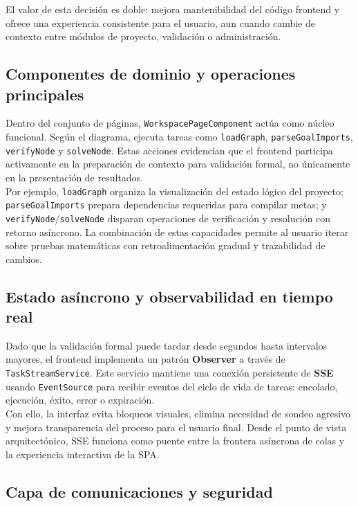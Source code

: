 \documentclass[12pt, letterpaper]{article}
\begin{document}
El valor de esta decisión es doble: mejora mantenibilidad del código frontend y ofrece una experiencia consistente para el usuario, aun cuando cambie de contexto entre módulos de proyecto, validación o administración.

\subsection{Componentes de dominio y operaciones principales}

Dentro del conjunto de páginas, \texttt{WorkspacePageComponent} actúa como núcleo funcional. Según el diagrama, ejecuta tareas como \texttt{loadGraph}, \texttt{parseGoalImports}, \texttt{verifyNode} y \texttt{solveNode}. Estas acciones evidencian que el frontend participa activamente en la preparación de contexto para validación formal, no únicamente en la presentación de resultados.\\

Por ejemplo, \texttt{loadGraph} organiza la visualización del estado lógico del proyecto; \texttt{parseGoalImports} prepara dependencias requeridas para compilar metas; y \texttt{verifyNode}/\texttt{solveNode} disparan operaciones de verificación y resolución con retorno asíncrono. La combinación de estas capacidades permite al usuario iterar sobre pruebas matemáticas con retroalimentación gradual y trazabilidad de cambios.

\subsection{Estado asíncrono y observabilidad en tiempo real}

Dado que la validación formal puede tardar desde segundos hasta intervalos mayores, el frontend implementa un patrón \textbf{Observer} a través de \texttt{TaskStreamService}. Este servicio mantiene una conexión persistente de \textbf{SSE} usando \texttt{EventSource} para recibir eventos del ciclo de vida de tareas: encolado, ejecución, éxito, error o expiración.\\

Con ello, la interfaz evita bloqueos visuales, elimina necesidad de sondeo agresivo y mejora transparencia del proceso para el usuario final. Desde el punto de vista arquitectónico, SSE funciona como puente entre la frontera asíncrona de colas y la experiencia interactiva de la SPA.

\subsection{Capa de comunicaciones y seguridad}
\end{document}
